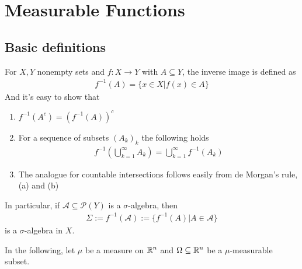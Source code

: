 \section{Measurable Functions}

\subsection{Basic definitions}
For $X,Y$ nonempty sets and $f: X \to  Y$ with $A \subseteq Y$, the inverse image is defined as
\begin{align*}
  f^{-1}(A) = \{x \in X \big\vert f(x)\in A\}
\end{align*}
And it's easy to show that 
\begin{enumerate}
  \item $f^{-1}(A^{c}) = \left(f^{-1}(A)\right)^{c}$
  \item For a sequence of subsets $(A_k)_{k}$ the following holds
    \begin{align*}
      f^{-1} \left(
        \bigcup_{k = 1}^{\infty}A_k
      \right)
      = \bigcup_{k=1}^{\infty}f^{-1}(A_k)
    \end{align*}
  \item The analogue for countable intersections follows easily from de Morgan's rule, (a) and (b)
\end{enumerate}
In particular, if $\mathcal{A} \subseteq \mathcal{P}(Y)$ is a $\sigma$-algebra, then 
\begin{align*}
  \Sigma := f^{-1}(\mathcal{A}) := \{f^{-1}(A) \big\vert A \in \mathcal{A}\}
\end{align*}
is a $\sigma$-algebra in $X$.


In the following, let $\mu$ be a measure on $\mathbb{R}^{n}$ and $\Omega \subseteq \mathbb{R}^{n}$ be a $\mu$-measurable subset.

